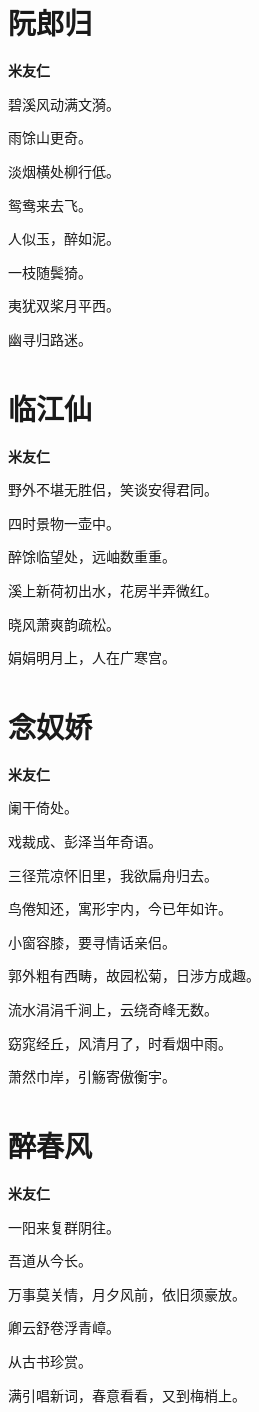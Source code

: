 \documentclass[12pt,a4paper]{ctexbook}
\begin{document}
\section{阮郎归}
\textbf{米友仁}\par\vspace{0.5em}
碧溪风动满文漪。\par
雨馀山更奇。\par
淡烟横处柳行低。\par
鸳鸯来去飞。\par
人似玉，醉如泥。\par
一枝随鬓猗。\par
夷犹双桨月平西。\par
幽寻归路迷。\par

\section{临江仙}
\textbf{米友仁}\par\vspace{0.5em}
野外不堪无胜侣，笑谈安得君同。\par
四时景物一壶中。\par
醉馀临望处，远岫数重重。\par
溪上新荷初出水，花房半弄微红。\par
晓风萧爽韵疏松。\par
娟娟明月上，人在广寒宫。\par

\section{念奴娇}
\textbf{米友仁}\par\vspace{0.5em}
阑干倚处。\par
戏裁成、彭泽当年奇语。\par
三径荒凉怀旧里，我欲扁舟归去。\par
鸟倦知还，寓形宇内，今已年如许。\par
小窗容膝，要寻情话亲侣。\par
郭外粗有西畴，故园松菊，日涉方成趣。\par
流水涓涓千涧上，云绕奇峰无数。\par
窈窕经丘，风清月了，时看烟中雨。\par
萧然巾岸，引觞寄傲衡宇。\par

\section{醉春风}
\textbf{米友仁}\par\vspace{0.5em}
一阳来复群阴往。\par
吾道从今长。\par
万事莫关情，月夕风前，依旧须豪放。\par
卿云舒卷浮青嶂。\par
从古书珍赏。\par
满引唱新词，春意看看，又到梅梢上。\par
\end{document}
